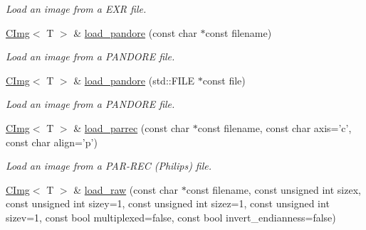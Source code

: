 \begin{DoxyCompactItemize}
\begin{DoxyCompactList}\small\item\em Load an image from a EXR file. \item\end{DoxyCompactList}\item 
\hypertarget{structcimg__library_1_1CImg_a1c52c863e6b22a98b8049b46bfc16102}{
\hyperlink{structcimg__library_1_1CImg}{CImg}$<$ T $>$ \& \hyperlink{structcimg__library_1_1CImg_a1c52c863e6b22a98b8049b46bfc16102}{load\_\-pandore} (const char $\ast$const filename)}
\label{structcimg__library_1_1CImg_a1c52c863e6b22a98b8049b46bfc16102}

\begin{DoxyCompactList}\small\item\em Load an image from a PANDORE file. \item\end{DoxyCompactList}\item 
\hypertarget{structcimg__library_1_1CImg_aa2c4311d68f8f2d98e856d4e73136540}{
\hyperlink{structcimg__library_1_1CImg}{CImg}$<$ T $>$ \& \hyperlink{structcimg__library_1_1CImg_aa2c4311d68f8f2d98e856d4e73136540}{load\_\-pandore} (std::FILE $\ast$const file)}
\label{structcimg__library_1_1CImg_aa2c4311d68f8f2d98e856d4e73136540}

\begin{DoxyCompactList}\small\item\em Load an image from a PANDORE file. \item\end{DoxyCompactList}\item 
\hypertarget{structcimg__library_1_1CImg_ac0e4d9f758cd33bb7c940a63ac27c103}{
\hyperlink{structcimg__library_1_1CImg}{CImg}$<$ T $>$ \& \hyperlink{structcimg__library_1_1CImg_ac0e4d9f758cd33bb7c940a63ac27c103}{load\_\-parrec} (const char $\ast$const filename, const char axis='c', const char align='p')}
\label{structcimg__library_1_1CImg_ac0e4d9f758cd33bb7c940a63ac27c103}

\begin{DoxyCompactList}\small\item\em Load an image from a PAR-\/REC (Philips) file. \item\end{DoxyCompactList}\item 
\hypertarget{structcimg__library_1_1CImg_aff2e5fd6242828f8c83e652daea0861e}{
\hyperlink{structcimg__library_1_1CImg}{CImg}$<$ T $>$ \& \hyperlink{structcimg__library_1_1CImg_aff2e5fd6242828f8c83e652daea0861e}{load\_\-raw} (const char $\ast$const filename, const unsigned int sizex, const unsigned int sizey=1, const unsigned int sizez=1, const unsigned int sizev=1, const bool multiplexed=false, const bool invert\_\-endianness=false)}
\label{structcimg__library_1_1CImg_aff2e5fd6242828f8c83e652daea0861e}


\end{DoxyCompactItemize}
